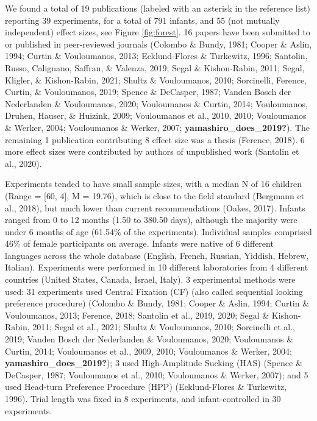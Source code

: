 \documentclass[
  english,
  man]{apa6}
\begin{document}
We found a total of 19 publications (labeled with an asterisk in the reference list) reporting 39 experiments, for a total of 791 infants, and 55 (not mutually independent) effect sizes, see Figure \ref{fig:forest}. 16 papers have been submitted to or published in peer-reviewed journals (Colombo \& Bundy, 1981; Cooper \& Aslin, 1994; Curtin \& Vouloumanos, 2013; Ecklund-Flores \& Turkewitz, 1996; Santolin, Russo, Calignano, Saffran, \& Valenza, 2019; Segal \& Kishon-Rabin, 2011; Segal, Kligler, \& Kishon-Rabin, 2021; Shultz \& Vouloumanos, 2010; Sorcinelli, Ference, Curtin, \& Vouloumanos, 2019; Spence \& DeCasper, 1987; Vanden Bosch der Nederlanden \& Vouloumanos, 2020; Vouloumanos \& Curtin, 2014; Vouloumanos, Druhen, Hauser, \& Huizink, 2009; Vouloumanos et al., 2010, 2010; Vouloumanos \& Werker, 2004; Vouloumanos \& Werker, 2007; \textbf{yamashiro\_does\_2019?}). The remaining 1 publication contributing 8 effect size was a thesis (Ference, 2018). 6 more effect sizes were contributed by authors of unpublished work (Santolin et al., 2020).

Experiments tended to have small sample sizes, with a median N of 16 children (Range = {[}60, 4{]}, M = 19.76), which is close to the field standard (Bergmann et al., 2018), but much lower than current recommendations (Oakes, 2017). Infants ranged from 0 to 12 months (1.50 to 380.50 days), although the majority were under 6 months of age (61.54\% of the experiments). Individual samples comprised 46\% of female participants on average. Infants were native of 6 different languages across the whole database (English, French, Russian, Yiddish, Hebrew, Italian).
Experiments were performed in 10 different laboratories from 4 different countries (United States, Canada, Israel, Italy). 3 experimental methods were used: 31 experiments used Central Fixation (CF) (also called sequential looking preference procedure) (Colombo \& Bundy, 1981; Cooper \& Aslin, 1994; Curtin \& Vouloumanos, 2013; Ference, 2018; Santolin et al., 2019, 2020; Segal \& Kishon-Rabin, 2011; Segal et al., 2021; Shultz \& Vouloumanos, 2010; Sorcinelli et al., 2019; Vanden Bosch der Nederlanden \& Vouloumanos, 2020; Vouloumanos \& Curtin, 2014; Vouloumanos et al., 2009, 2010; Vouloumanos \& Werker, 2004; \textbf{yamashiro\_does\_2019?}); 3 used High-Amplitude Sucking (HAS) (Spence \& DeCasper, 1987; Vouloumanos et al., 2010; Vouloumanos \& Werker, 2007); and 5 used Head-turn Preference Procedure (HPP) (Ecklund-Flores \& Turkewitz, 1996). Trial length was fixed in 8 experiments, and infant-controlled in 30 experiments.
\end{document}
